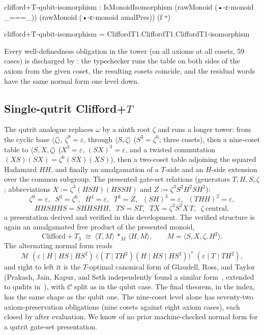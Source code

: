 \begin{code}
clifford+T-qubit-isomorphism : IsMonoidIsomorphism
  (rawMonoid (•-ε-monoid _===_)) (rawMonoid (•-ε-monoid amalPres)) (f ʷ)
\end{code}
\begin{code}[hide]
clifford+T-qubit-isomorphism = CliffordT1.CliffordT1.CliffordT1-isomorphism
\end{code}

Every well-definedness obligation in the tower (on all axioms at all
cosets, 59 cases) is discharged by
: the typechecker runs the table
on both sides of the axiom from the given coset, the resulting cosets
coincide, and the residual words have the same normal form one level
down.

\subsection{Single-qutrit Clifford+$T$}\label{sec:qutrit}

The qutrit analogue replaces $\omega$ by a ninth root $\zeta$ and runs a
longer tower: from the cyclic base $\langle \zeta \rangle$,
$\zeta^9 = \varepsilon$, through
$\langle S, \zeta \rangle$ ($S^3 = \zeta^6$; three cosets), then a
nine-coset table to $\langle S, X, \zeta \rangle$
($X^3 = \varepsilon$, $(SX)^3 = \varepsilon$, and a twisted commutation
$(XS)(SX) = \zeta^6 (SX)(XS)$), then a two-coset table adjoining the
squared Hadamard $H\!H$, and finally an amalgamation of a $T$-side and an
$H$-side extension over the common subgroup.  The presented gate-set
relations (generators $T, H, S, \zeta$; abbreviations
$X := \zeta^3 (HSH)(HSSH)$ and $Z := \zeta^3 S^2 H^2 S H^2$):
\[
  \zeta^9 = \varepsilon,\;\;
  S^3 = \zeta^6,\;\;
  H^4 = \varepsilon,\;\;
  T^3 = Z,\;\;
  (SH)^3 = \varepsilon,\;\;
  (THH)^2 = \varepsilon,
\]
\[
  HHSHHS = SHHSHH,\;\;
  TS = ST,\;\;
  TX = \zeta^3 S^2 X\, T,\;\;
  \zeta\ \text{central},
\]
a presentation derived and verified in this development.  The verified
structure is again an amalgamated free product of the presented monoid,
\[
  \mathrm{Clifford}{+}T_3 \;\cong\;
  \langle T, M \rangle \,\ast_{M}\, \langle H, M \rangle,
  \qquad M = \langle S, X, \zeta, H^2 \rangle.
\]
The alternating normal form reads
\[
  \mathcal{M}\;(\varepsilon \mid H \mid HS \mid HS^2)\;
  \bigl((T \mid TH^2)(H \mid HS \mid HS^2)\bigr)^{*}\;
  (\varepsilon \mid T \mid TH^2),
\]
and right to left it is the $T$-optimal canonical form of Glaudell,
Ross, and Taylor~\cite{glaudell2019qutrit}
(Prakash, Jain, Kapur, and Seth independently found a similar
form~\cite{prakash2018qutrit}, extended to qudits
in~\cite{jain2020qudit}), with $\mathcal{C}$ split as in the qubit
case.  The final theorem,  in the
index, has the same shape as the qubit one.  The nine-coset level alone
has seventy-two axiom-preservation obligations (nine cosets against eight
axiom cases), each closed by  after evaluation.  We know of no prior
machine-checked normal form for a qutrit gate-set presentation.

